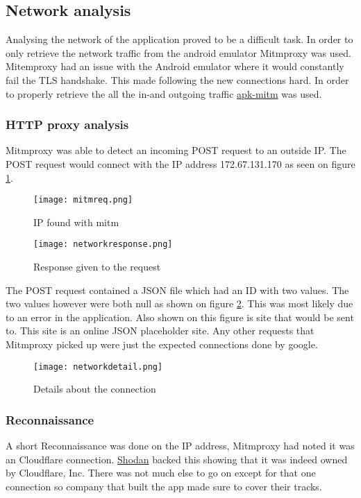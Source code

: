 \subsection{Network analysis}

Analysing the network of the application proved to be a difficult task. 
In order to only retrieve the network traffic from the android emulator Mitmproxy was used.
Mitemproxy had an issue with the Android emulator where it would constantly fail the TLS handshake. 
This made following the new connections hard. 
In order to properly retrieve the all the in-and outgoing traffic \href{https://github.com/shroudedcode/apk-mitm}{apk-mitm} was used.



\subsubsection{HTTP proxy analysis}

Mitmproxy was able to detect an incoming POST request to an outside IP. 
The POST request would connect with the IP address 172.67.131.170 as seen on figure \ref{tim-mitmrequest}.

\begin{figure}[H]
    \texttt{[image: mitmreq.png]}
    \caption{IP found with mitm}
    \label{tim-mitmrequest}
\end{figure}

\begin{figure}[H]
    \texttt{[image: networkresponse.png]}
    \caption{Response given to the request}
    \label{tim-mitmresponse}
\end{figure}

The POST request contained a JSON file which had an ID with two values. 
The two values however were both null as shown on figure \ref{tim-mitmresponse}.
This was most likely due to an error in the application. 
Also shown on this figure is site that would be sent to.
This site is an online JSON placeholder site.
Any other requests that Mitmproxy picked up were just the expected connections done by google.

\begin{figure}[H]
    \texttt{[image: networkdetail.png]}
    \caption{Details about the connection}
    \label{tim-mitmdetail}
\end{figure}

\subsubsection{Reconnaissance}

A short Reconnaissance was done on the IP address, Mitmproxy had noted it was an Cloudflare connection.
\href{https://www.shodan.io/host/172.67.131.170}{Shodan} backed this showing that it was indeed owned by Cloudflare, Inc.
There was not much else to go on except for that one connection so company that built the app made sure to cover their tracks.

